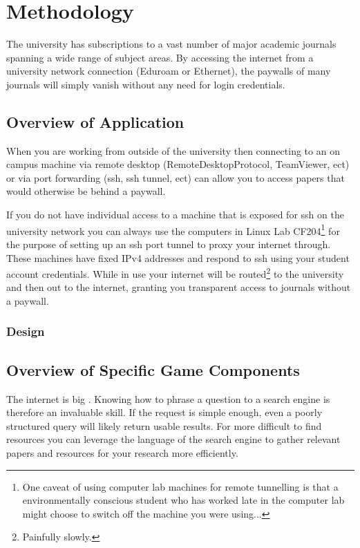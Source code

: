 \chapter{Methodology}
	\label{chap:methodology}
		
	The university has subscriptions to a vast number of major academic journals spanning a wide range of subject areas. By accessing the internet from a university network connection (Eduroam or Ethernet), the paywalls of many journals will simply vanish without any need for login credentials.

	\section{Overview of Application}
		When you are working from outside of the university then connecting to an on campus machine via remote desktop (RemoteDesktopProtocol, TeamViewer, ect) or via port forwarding (ssh, ssh tunnel, ect) can allow you to access papers that would otherwise be behind a paywall. 
		
		If you do not have individual access to a machine that is exposed for ssh on the university network you can always use the computers in Linux Lab CF204\footnote{One caveat of using computer lab machines for remote tunnelling is that a environmentally conscious student who has worked late in the computer lab might choose to switch off the machine you were using...} for the purpose of setting up an ssh port tunnel to proxy your internet through. These machines have fixed IPv4 addresses and respond to ssh using your student account credentials. While in use your internet will be routed\footnote{Painfully slowly.} to the university and then out to the internet, granting you transparent access to journals without a paywall.
		
	\subsection{Design}

	\section{Overview of Specific Game Components}
		\label{sec:overview_game_components}
		The internet is big \cite{sizeofinternet}. Knowing how to phrase a question to a search engine is therefore an invaluable skill. If the request is simple enough, even a poorly structured query will likely return usable results. For more difficult to find resources you can leverage the language of the search engine to gather relevant papers and resources for your research more efficiently. 
		
